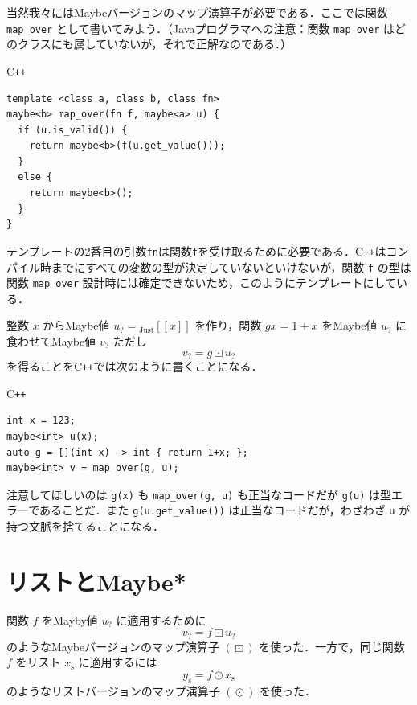 \documentclass[a5paper,twoside,fleqn,draft]{jsbook}
\def\[{[\![}
\def\]{]\!]}
\newcommand{\programminglanguage}[1]{\textsf{#1}}
\newcommand{\cxx}{\programminglanguage{C}\texttt{++}}
\newcommand{\cxxzerothree}{\cxx\programminglanguage{03}}
\newcommand{\java}{\programminglanguage{Java}}
\newcommand{\code}[1]{\texttt{#1}}
\newenvironment{cxxcode}{\begin{itembox}[r]{\cxx}}{\end{itembox}}
\DeclareMathOperator{\mMapList}{\odot}
\DeclareMathOperator{\mMapMaybe}{\boxdot}
\newcommand{\mValueConstructor}[1]{\mathrm{#1}}
\newcommand{\mValueWith}[2]{{}_\mValueConstructor{#1}\[#2\]}
\newcommand{\mJustWith}[1]{\mValueWith{Just}{#1}}
\newcommand{\mList}[1]{{#1}_\mathrm{s}}
\newcommand{\mMaybe}[1]{{#1}_?}
\begin{document}
当然我々にはMaybeバージョンのマップ演算子が必要である．ここでは関数 \code{map\_over} として書いてみよう．（\java プログラマへの注意：関数 \code{map\_over} はどのクラスにも属していないが，それで正解なのである．）
\begin{cxxcode}
\begin{verbatim}
template <class a, class b, class fn>
maybe<b> map_over(fn f, maybe<a> u) {
  if (u.is_valid()) {
    return maybe<b>(f(u.get_value()));
  }
  else {
    return maybe<b>();
  }
}
\end{verbatim}
\end{cxxcode}
テンプレートの2番目の引数\code{fn}は関数\code{f}を受け取るために必要である．\cxx はコンパイル時までにすべての変数の型が決定していないといけないが，関数 \code{f} の型は関数 \code{map\_over} 設計時には確定できないため，このようにテンプレートにしている．

整数 $x$ からMaybe値 $\mMaybe{u}=\mJustWith{x}$ を作り，関数 $gx=1+x$ をMaybe値 $\mMaybe{u}$ に食わせてMaybe値 $\mMaybe{v}$ ただし
\begin{equation}
  \mMaybe{v}
  =g\mMapMaybe\mMaybe{u}
\end{equation}
を得ることを\cxx では次のように書くことになる．
\begin{cxxcode}
\begin{verbatim}
int x = 123;
maybe<int> u(x);
auto g = [](int x) -> int { return 1+x; };
maybe<int> v = map_over(g, u);
\end{verbatim}
\end{cxxcode}
注意してほしいのは \code{g(x)} も \code{map\_over(g, u)} も正当なコードだが \code{g(u)} は型エラーであることだ．また \code{g(u.get\_value())} は正当なコードだが，わざわざ \code{u} が持つ文脈を捨てることになる．


\section{リストとMaybe*}

関数 $f$ をMayby値 $\mMaybe{u}$ に適用するために
\begin{equation}
  \mMaybe{v}
  =f\mMapMaybe\mMaybe{u}
\end{equation}
のようなMaybeバージョンのマップ演算子 $(\mMapMaybe)$ を使った．一方で，同じ関数 $f$ をリスト $\mList{x}$ に適用するには
\begin{equation}
  \mList{y}
  =f\mMapList\mList{x}
\end{equation}
のようなリストバージョンのマップ演算子 $(\mMapList)$ を使った．
\end{document}
